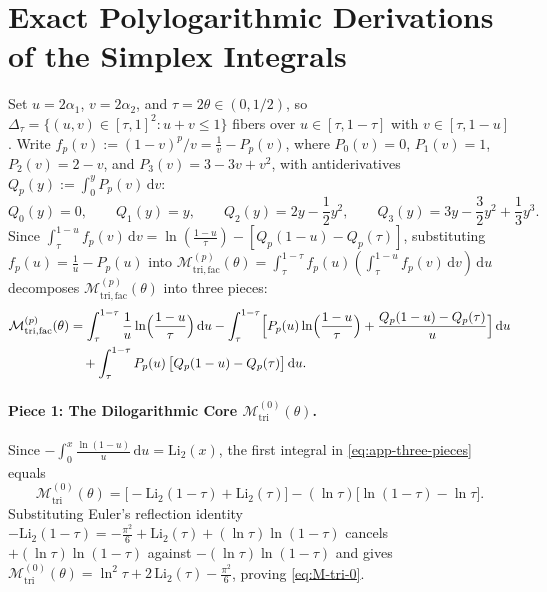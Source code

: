 \documentclass[11pt,reqno]{amsart}
\theoremstyle{definition}
\theoremstyle{remark}
\numberwithin{equation}{section}
\newcommand{\dd}{\mathrm{d}}
\newcommand{\Li}{\mathrm{Li}}
\newcommand{\tri}{\mathrm{tri}}
\newcommand{\facw}{\mathrm{fac}}
\begin{document}
\appendix

\section{Exact Polylogarithmic Derivations of the Simplex Integrals}\label{app:dilogarithm}

Set $u = 2\alpha_1$, $v = 2\alpha_2$, and $\tau = 2\theta \in (0,1/2)$, so $\Delta_\tau = \{(u,v) \in [\tau,1]^2 : u+v \le 1\}$ fibers over $u \in [\tau, 1-\tau]$ with $v \in [\tau, 1-u]$. Write $f_p(v) := (1-v)^p/v = \frac{1}{v} - P_p(v)$, where $P_0(v)=0$, $P_1(v)=1$, $P_2(v)=2-v$, and $P_3(v)=3-3v+v^2$, with antiderivatives $Q_p(y) := \int_0^y P_p(v)\,\dd v$:
\[
Q_0(y) = 0, \qquad Q_1(y) = y, \qquad Q_2(y) = 2y - \frac{1}{2}y^2, \qquad Q_3(y) = 3y - \frac{3}{2}y^2 + \frac{1}{3}y^3.
\]
Since $\int_\tau^{1-u} f_p(v)\,\dd v = \ln(\frac{1-u}{\tau}) - [Q_p(1-u) - Q_p(\tau)]$, substituting $f_p(u) = \frac{1}{u} - P_p(u)$ into $\mathcal{M}_{\tri,\facw}^{(p)}(\theta) = \int_\tau^{1-\tau} f_p(u)(\int_\tau^{1-u} f_p(v)\,\dd v)\,\dd u$ decomposes $\mathcal{M}_{\tri,\facw}^{(p)}(\theta)$ into three pieces:
\begin{align}
\mathcal{M}_{\tri,\facw}^{(p)}(\theta) &= \int_{\tau}^{1-\tau} \frac{1}{u}\ln\Bigl(\frac{1-u}{\tau}\Bigr)\,\dd u - \int_{\tau}^{1-\tau} \Bigl[P_p(u)\ln\Bigl(\frac{1-u}{\tau}\Bigr) + \frac{Q_p(1-u) - Q_p(\tau)}{u}\Bigr]\,\dd u \nonumber\\
&\quad + \int_{\tau}^{1-\tau} P_p(u)\,\bigl[Q_p(1-u) - Q_p(\tau)\bigr]\,\dd u. \label{eq:app-three-pieces}
\end{align}

\paragraph{\textbf{Piece 1: The Dilogarithmic Core $\mathcal{M}_{\tri}^{(0)}(\theta)$.}}
Since $-\int_0^x \frac{\ln(1-u)}{u}\,\dd u = \Li_2(x)$, the first integral in \eqref{eq:app-three-pieces} equals
\[
\mathcal{M}_{\tri}^{(0)}(\theta) = \bigl[-\Li_2(1-\tau) + \Li_2(\tau)\bigr] - (\ln\tau)\bigl[\ln(1-\tau) - \ln\tau\bigr].
\]
Substituting Euler's reflection identity $-\Li_2(1-\tau) = -\frac{\pi^2}{6} + \Li_2(\tau) + (\ln\tau)\ln(1-\tau)$ \cite{Lewin1981} cancels $+(\ln\tau)\ln(1-\tau)$ against $-(\ln\tau)\ln(1-\tau)$ and gives $\mathcal{M}_{\tri}^{(0)}(\theta) = \ln^2\tau + 2\,\Li_2(\tau) - \frac{\pi^2}{6}$, proving \eqref{eq:M-tri-0}.
\end{document}
